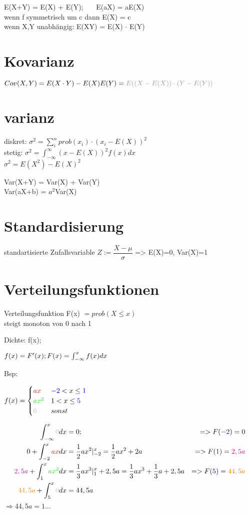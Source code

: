 E(X+Y) = E(X) + E(Y);~~~ E(aX) = aE(X) \\
wenn f symmetrisch um c dann E(X) = c\\
wenn X,Y unabhängig: E(XY) = E(X) $\cdot$ E(Y)

\section*{Kovarianz}
$Cov(X,Y) = E(X \cdot Y) -E(X)E(Y)= \gray{E((X-E(X))\cdot(Y-E(Y)) }$

\section*{varianz}
diskret: $ \sigma^2 = \sum_i^n prob(x_i)\cdot (x_i -E(X))^2$\\
stetig: $ \sigma^2 = \int_{-\infty}^{\infty} (x -E(X))^2 f(x) dx$ \\
$\sigma^2 = E(X^2) - E(X)^2$

Var(X+Y) = Var(X) + Var(Y) \\
Var(aX+b) = $a^2$Var(X)


\section*{Standardisierung}
standartisierte Zufallsvariable $Z:=\dfrac{X-\mu}{\sigma}$ => E(X)=0, Var(X)=1


\section*{Verteilungsfunktionen}
Verteilungsfunktion F(x) $= prob(X \leq x)$\\
steigt monoton von 0 nach 1

Dichte: f(x);

$f(x) = F'(x); \\
 F(x) = \int_{-\infty}^xf(x)dx$

Bsp: 

$f(x) = \begin{cases}
\textcolor{red}{ax}   &  \textcolor{blue}{-2} < x \leq \textcolor{blue}{1} \\ 
\textcolor{green}{ax^2} & 1<x\leq \textcolor{blue}{5}\\ 
\textcolor{lightgray}{0}  & sonst
\end{cases}$

\begin{align*}
\int_{-\infty}^x \textcolor{lightgray}{0} dx & = 0;  &=> F(\textcolor{blue}{-2}) = 0
\\
0 + \int_{-2}^x \textcolor{red}{ax} dx & = \frac{1}{2}ax^2 |_{-2}^x = \frac{1}{2}ax^2 +2a &=> F(\textcolor{blue}{1}) = \textcolor{magenta}{2,5a} 
\\
\textcolor{magenta}{2,5a} + \int_{1}^x \textcolor{green}{ax^2} dx &= \frac{1}{3}ax^3 |_{1}^x +2,5a =  \frac{1}{3}ax^3 + \frac{1}{3} a  +2,5a &=> F(\textcolor{blue}{5}) = \textcolor{orange}{44,5 a}
\\ 
\textcolor{orange}{44,5 a} + \int_5^x \textcolor{lightgray}{0} dx &= 44,5a
\end{align*}
$ \Rightarrow 44,5a = 1 \dots$ 


